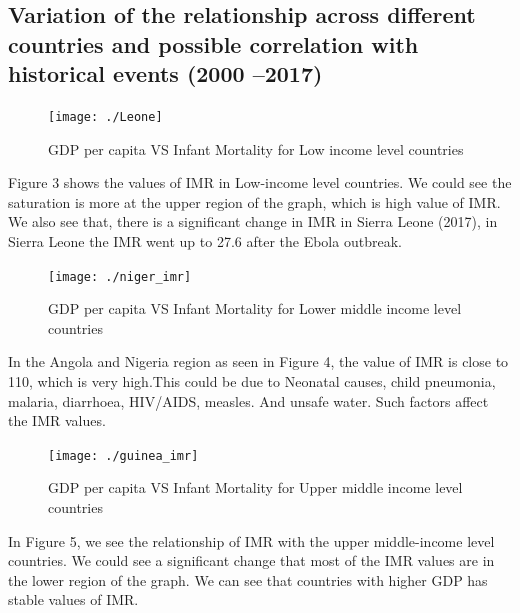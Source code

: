 \documentclass[
]{article}
\begin{document}
\hypertarget{variation-of-the-relationship-across-different-countries-and-possible-correlation-with-historical-events-2000-2017}{%
\subsection{Variation of the relationship across different countries and
possible correlation with historical events (2000
--2017)}\label{variation-of-the-relationship-across-different-countries-and-possible-correlation-with-historical-events-2000-2017}}

\begin{figure}[H]

{\centering \texttt{[image: ./Leone]} 

}

\caption{GDP per capita VS Infant Mortality for Low income level countries}\label{fig:plot3}
\end{figure}

Figure 3 shows the values of IMR in Low-income level countries. We could
see the saturation is more at the upper region of the graph, which is
high value of IMR. We also see that, there is a significant change in
IMR in Sierra Leone (2017), in Sierra Leone the IMR went up to 27.6
after the Ebola outbreak.

\begin{figure}[H]

{\centering \texttt{[image: ./niger\_imr]} 

}

\caption{GDP per capita VS Infant Mortality for Lower middle income level countries}\label{fig:plot4}
\end{figure}

In the Angola and Nigeria region as seen in Figure 4, the value of IMR
is close to 110, which is very high.This could be due to Neonatal
causes, child pneumonia, malaria, diarrhoea, HIV/AIDS, measles. And
unsafe water. Such factors affect the IMR values.

\begin{figure}[H]

{\centering \texttt{[image: ./guinea\_imr]} 

}

\caption{GDP per capita VS Infant Mortality for Upper middle income level countries}\label{fig:plot5}
\end{figure}

In Figure 5, we see the relationship of IMR with the upper middle-income
level countries. We could see a significant change that most of the IMR
values are in the lower region of the graph. We can see that countries
with higher GDP has stable values of IMR.
\end{document}
